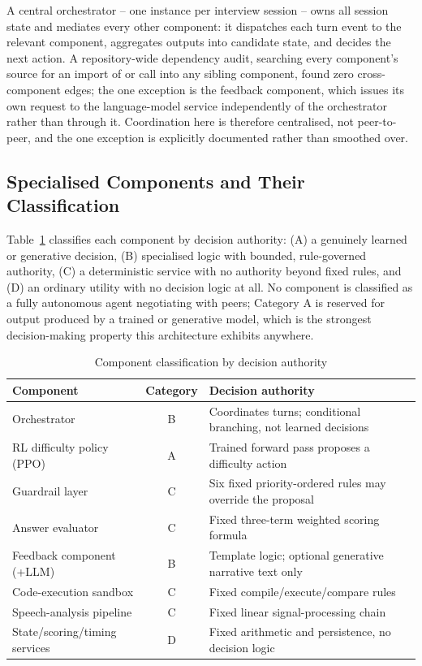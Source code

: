 \documentclass[runningheads]{llncs}
\begin{document}
A central orchestrator -- one instance per interview session -- owns all session state and mediates every other component: it dispatches each turn event to the relevant component, aggregates outputs into candidate state, and decides the next action. A repository-wide dependency audit, searching every component's source for an import of or call into any sibling component, found zero cross-component edges; the one exception is the feedback component, which issues its own request to the language-model service independently of the orchestrator rather than through it. Coordination here is therefore centralised, not peer-to-peer, and the one exception is explicitly documented rather than smoothed over.

\subsection{Specialised Components and Their Classification}

Table~\ref{tab:classification} classifies each component by decision authority: (A) a genuinely learned or generative decision, (B) specialised logic with bounded, rule-governed authority, (C) a deterministic service with no authority beyond fixed rules, and (D) an ordinary utility with no decision logic at all. No component is classified as a fully autonomous agent negotiating with peers; Category A is reserved for output produced by a trained or generative model, which is the strongest decision-making property this architecture exhibits anywhere.

\begin{table}[t]
\centering
\caption{Component classification by decision authority}
\label{tab:classification}
\small
\begin{tabular}{p{3.1cm}cp{6.3cm}}
\toprule
\textbf{Component} & \textbf{Category} & \textbf{Decision authority} \\
\midrule
Orchestrator & B & Coordinates turns; conditional branching, not learned decisions \\
RL difficulty policy (PPO) & A & Trained forward pass proposes a difficulty action \\
Guardrail layer & C & Six fixed priority-ordered rules may override the proposal \\
Answer evaluator & C & Fixed three-term weighted scoring formula \\
Feedback component (+LLM) & B & Template logic; optional generative narrative text only \\
Code-execution sandbox & C & Fixed compile/execute/compare rules \\
Speech-analysis pipeline & C & Fixed linear signal-processing chain \\
State/scoring/timing services & D & Fixed arithmetic and persistence, no decision logic \\
\bottomrule
\end{tabular}
\end{table}
\end{document}

